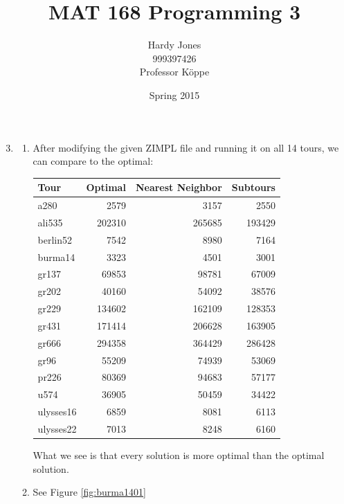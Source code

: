 \documentclass[12pt,letterpaper]{article}
\title{MAT 168 Programming 3\vspace{-2ex}}
\author{Hardy Jones\\
        999397426\\
        Professor K\"{o}ppe\vspace{-2ex}}
\date{Spring 2015}
\begin{document}
  \maketitle

  \begin{enumerate}
    \setcounter{enumi}{2}
    \item
      \begin{enumerate}
        \item
          After modifying the given ZIMPL file and running it on all 14 tours,
          we can compare to the optimal:

          \begin{tabular}{l | r | r | r}
            \hline
            \hline
            Tour      & Optimal & Nearest Neighbor & Subtours \\
            \hline
            a280      & 2579    & 3157             & 2550     \\
            ali535    & 202310  & 265685           & 193429   \\
            berlin52  & 7542    & 8980             & 7164     \\
            burma14   & 3323    & 4501             & 3001     \\
            gr137     & 69853   & 98781            & 67009    \\
            gr202     & 40160   & 54092            & 38576    \\
            gr229     & 134602  & 162109           & 128353   \\
            gr431     & 171414  & 206628           & 163905   \\
            gr666     & 294358  & 364429           & 286428   \\
            gr96      & 55209   & 74939            & 53069    \\
            pr226     & 80369   & 94683            & 57177    \\
            u574      & 36905   & 50459            & 34422    \\
            ulysses16 & 6859    & 8081             & 6113     \\
            ulysses22 & 7013    & 8248             & 6160     \\
            \hline
          \end{tabular}

          What we see is that every solution is more optimal than the optimal solution.
        \item
          See Figure \ref{fig:burma1401}


\end{enumerate}
\end{enumerate}
\end{document}
